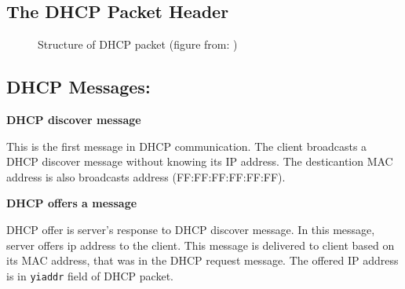 \documentclass[a4paper, 11pt, a4paper]{article}
\begin{document}
\subsection{The DHCP Packet Header}

\begin{figure}[ht]
    \begin{center}
    \end{center}
    \caption{Structure of DHCP packet (figure from: \cite{Avocado.Aun.dhcp})}
    \label{figure:dhcp-packet}
\end{figure}


\subsection{DHCP Messages: }

\noindent\large{\textbf{DHCP discover message}}

This is the first message in DHCP communication. The client broadcasts a DHCP discover message without knowing its IP address.
The desticantion MAC address is also broadcasts address (FF:FF:FF:FF:FF:FF).
\bigskip

\noindent\large{\textbf{DHCP offers a message}}

DHCP offer is server's response to DHCP discover message. In this message, server offers ip address to the client.
This message is delivered to client based on its MAC address, that was in the DHCP request message.
The offered IP address is in \texttt{yiaddr} field of DHCP packet.
\bigskip
\end{document}
